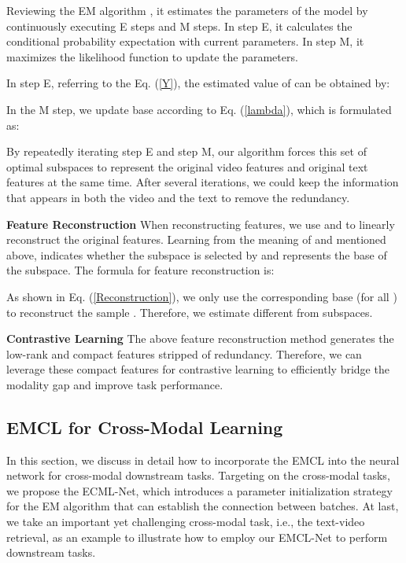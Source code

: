 \documentclass{article}
\newcommand{\myparagraph}[1]{\textbf{#1}\hspace{1.8ex}}
\begin{document}
Reviewing the EM algorithm \cite{dempster1977maximum}, it estimates the parameters of the model by continuously executing E steps and M steps. In step E, it calculates the conditional probability expectation with current parameters. In step M, it maximizes the likelihood function to update the parameters.

In step E, referring to the Eq. (\ref{Y}), the estimated value of  can be obtained by:


In the M step, we update base  according to Eq. (\ref{lambda}), which is formulated as:


By repeatedly iterating step E and step M, our algorithm forces this set of optimal subspaces to represent the original video features and original text features at the same time. After several iterations, we could keep the information that appears in both the video and the text to remove the redundancy.

\myparagraph{Feature Reconstruction}
When reconstructing features, we use  and  to linearly reconstruct the original features. Learning from the meaning of  and  mentioned above,  indicates whether the  subspace is selected by  and  represents the base of the  subspace. The formula for feature reconstruction is:


As shown in Eq. (\ref{Reconstruction}), we only use the corresponding base  (for all ) to reconstruct the  sample . Therefore, we estimate different  from  subspaces. 

\myparagraph{Contrastive Learning}
The above feature reconstruction method generates the low-rank and compact features stripped of redundancy. Therefore, we can leverage these compact features for contrastive learning to efficiently bridge the modality gap and improve task performance.


\vspace{-5pt}
\subsection{EMCL for Cross-Modal Learning}
\vspace{-5pt}
In this section, we discuss in detail how to incorporate the EMCL into the neural network for cross-modal downstream tasks.
Targeting on the cross-modal tasks, we propose the ECML-Net, which introduces a parameter initialization strategy for the EM algorithm that can establish the connection between batches.
At last, we take an important yet challenging cross-modal task, i.e., the text-video retrieval, as an example to illustrate how to employ our EMCL-Net to perform downstream tasks. 
\end{document}
